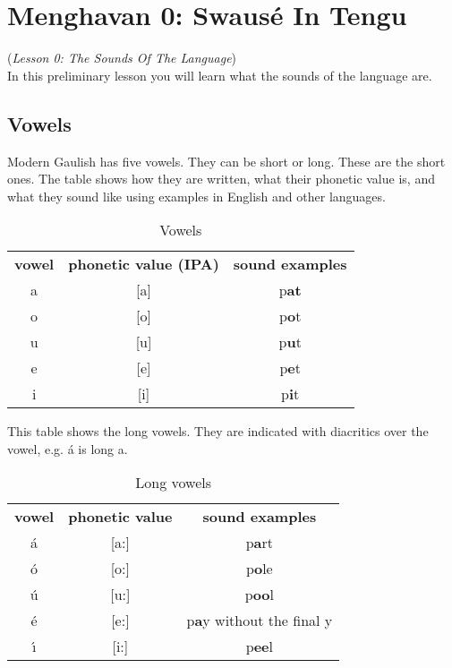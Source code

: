 \section{Menghavan 0: Swaus\'{e} In Tengu}
(\textit{Lesson 0: The Sounds Of The Language})\\

\noindent In this preliminary lesson you will learn what the sounds of the language are.

\subsection{Vowels}
\noindent Modern Gaulish has five vowels. They can be short or long. These are the short ones. The table shows how they are written, what their phonetic value is, and what they sound like using examples in English and other languages.

\begin{table}[H]
\begin{center}
\begin{tabular}{ccc}
  \toprule
  \textbf{vowel} & \textbf{phonetic value (IPA)} & \textbf{sound examples}\\
  \cmidrule(lr){1-1}\cmidrule(lr){2-2}\cmidrule(lr){3-3}
  a & [a] & p\textbf{at}\\
  o & [o] & p\textbf{o}t\\
  u & [u] & p\textbf{u}t\\
  e & [e] & p\textbf{e}t\\
  i & [i] & p\textbf{i}t\\
  \bottomrule
\end{tabular}
\end{center}
\caption{Vowels}
\label{phonology_vowels}
\end{table}

This table shows the long vowels. They are indicated with diacritics over the vowel, e.g. \'{a} is long a.

\begin{table}[H]
\begin{center}
\begin{tabular}{ccc}
  \toprule
  \textbf{vowel} & \textbf{phonetic value} & \textbf{sound examples}\\
  \cmidrule(lr){1-1}\cmidrule(lr){2-2}\cmidrule(lr){3-3}
  \'{a} & [a:] & p\textbf{a}rt\\
  \'{o} & [o:] & p\textbf{o}le\\
  \'{u} & [u:] & p\textbf{oo}l\\
  \'{e} & [e:] & p\textbf{a}y without the final y\\
  \'{\i} & [i:] & p\textbf{ee}l\\
  \bottomrule
\end{tabular}
\end{center}
\caption{Long vowels}
\label{phonology_long_vowels}
\end{table}

